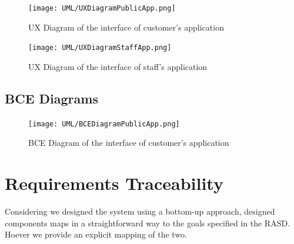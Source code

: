 \documentclass[11pt]{article} %
\begin{document}
\begin{figure}[H]
	\centering
	\texttt{[image: UML/UXDiagramPublicApp.png]}
	\caption{UX Diagram of the interface of customer's application}
\end{figure}

\begin{figure}[H]
	\centering
	\texttt{[image: UML/UXDiagramStaffApp.png]}
	\caption{UX Diagram of the interface of staff's application}
\end{figure}	

\subsection{BCE Diagrams}

\begin{figure}[H]
	\centering
	\texttt{[image: UML/BCEDiagramPublicApp.png]}
	\caption{BCE Diagram of the interface of customer's application}
\end{figure}	
	

\newpage
\section{Requirements Traceability}

Considering we designed the system using a bottom-up approach, designed components maps in a straightforward way to the goals specified in the RASD. Hoever we provide an explicit mapping of the two.
\end{document}
